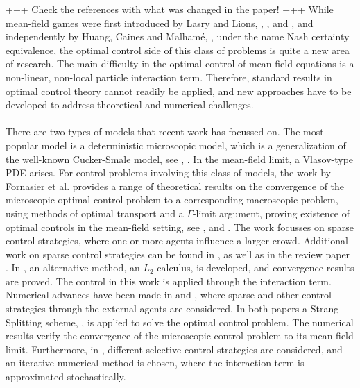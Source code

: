 +++ Check the references with what was changed in the paper! +++
While mean-field games were first introduced by Lasry and Lions, \cite{LASRY2006619}, \cite{LASRY2006679},\cite{LASRY4} and \cite{Lasry2007}, and independently by Huang, Caines and Malham\'e,  \cite{Huang1}, under the name Nash certainty equivalence, the optimal control side of this class of problems is quite a new area of research. The main difficulty in the optimal control of mean-field equations is a non-linear, non-local particle interaction term. Therefore, standard results in optimal control theory cannot readily be applied, and new approaches have to be developed to address theoretical and numerical challenges.
\\
\\
There are two types of models that recent work has focussed on. The most popular model is a deterministic microscopic model, which is a generalization of the well-known Cucker-Smale model, see \cite{CuckerSmale1}, \cite{CuckerSmale2}. In the mean-field limit, a Vlasov-type PDE arises. For control problems involving this class of models, the work by Fornasier et al. provides a range of theoretical results on the convergence of the microscopic optimal control problem to a corresponding macroscopic problem, using methods of optimal transport and a $\Gamma$-limit argument, proving existence of optimal controls in the mean-field setting, see \cite{Fornasier_2014},
\cite{Fornasier_2014no2}
and \cite{fornasier_lisini_orrieri_savare_2019}. The work focusses on sparse control strategies, where one or more agents influence a larger crowd.
Additional work on sparse control strategies can be found in \cite{piccoli2014no1}, as well as in the review paper \cite{Fornasier_20161no1}.
In \cite{burger2019meanfield}, an alternative method, an $L_2$ calculus, is developed, and convergence results are proved. The control in this work is applied through the interaction term. 
\\
Numerical advances have been made in \cite{burger2019instantaneous} and \cite{burger2016controlling}, where sparse and other control strategies through the external agents are considered. In both papers a Strang-Splitting scheme, \cite{ChengC.Z1976Tiot}, is applied to solve the optimal control problem. The numerical results verify the convergence of the microscopic control problem to its mean-field limit.
Furthermore, in \cite{albi2016selective}, different selective control strategies are considered, and an iterative numerical method is chosen, where the interaction term is approximated stochastically.
